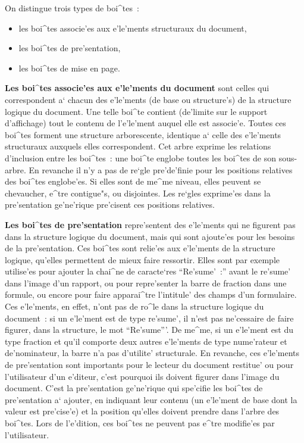 {On distingue trois types de boi^tes~:

\begin{itemize}
\item
les boi^tes associe'es aux e'le'ments structuraux du document,
\item
les boi^tes de pre'sentation,
\item
les boi^tes de mise en page.
\end{itemize}

{\bf Les boi^tes associe'es aux e'le'ments du document} sont celles qui
correspondent a` chacun des e'le'ments (de base ou structure's) de la structure
logique du document. Une telle boi^te contient (de'limite sur le support
d'affichage) tout le contenu de l'e'le'ment auquel elle est associe'e.
Toutes ces boi^tes forment une structure arborescente, identique
a` celle des e'le'ments structuraux auxquels elles correspondent.
Cet arbre exprime les relations d'inclusion entre les boi^tes~:
une boi^te englobe toutes les boi^tes de son sous-arbre. En revanche il
n'y a pas de re`gle pre'de'finie pour les positions relatives des boi^tes
englobe'es. Si elles sont de me^me niveau, elles peuvent se chevaucher,
e^tre contigue"s, ou disjointes. Les re`gles exprime'es dans la pre'sentation
ge'ne'rique pre'cisent ces positions relatives.

{\bf Les boi^tes de pre'sentation} repre'sentent des e'le'ments qui ne figurent
pas dans la structure logique du document, mais qui sont ajoute'es pour
les besoins de la pre'sentation. Ces boi^tes sont relie'es aux e'le'ments de la
structure logique, qu'elles permettent de mieux faire ressortir.
Elles sont par exemple utilise'es pour ajouter la chai^ne de
caracte`res ``Re'sume'~:'' avant le re'sume' dans l'image d'un rapport, ou
pour repre'senter la barre de fraction dans une formule, ou encore pour
faire apparai^tre l'intitule' des champs d'un formulaire. Ces
e'le'ments, en effet, n'ont pas de ro^le dans la structure logique du
document~: si un e'le'ment est de type re'sume', il n'est pas ne'cessaire
de faire figurer, dans la structure, le mot ``Re'sume'''. De me^me, si un
e'le'ment est du type fraction et qu'il comporte deux autres e'le'ments
de type nume'rateur et de'nominateur, la barre n'a pas d'utilite'
structurale. En revanche, ces e'le'ments de pre'sentation sont importants
pour le lecteur du document restitue' ou pour l'utilisateur d'un e'diteur,
c'est pourquoi ils doivent figurer dans l'image du document.
C'est la pre'sentation ge'ne'rique qui spe'cifie les boi^tes de pre'sentation
a` ajouter, en indiquant leur contenu (un e'le'ment de base dont la valeur
est pre'cise'e) et la position qu'elles doivent prendre dans l'arbre des
boi^tes. Lors de l'e'dition, ces boi^tes ne peuvent pas e^tre modifie'es
par l'utilisateur.

}

